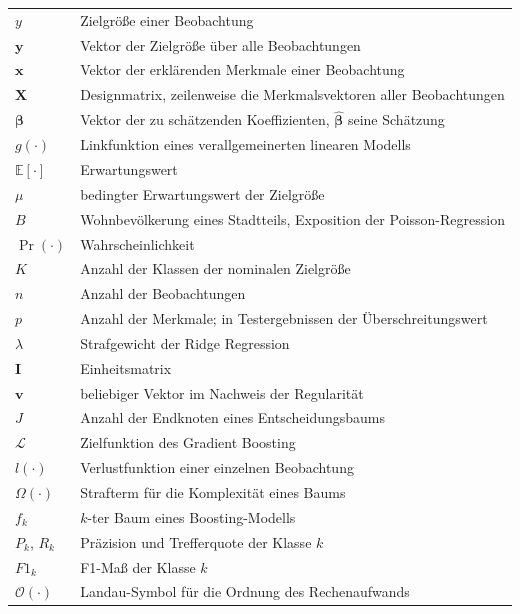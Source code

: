\documentclass[12pt,a4paper]{article}
\begin{document}
\begin{longtable}{@{}ll}
$y$ & Zielgröße einer Beobachtung \\[12pt]
$\mathbf{y}$ & Vektor der Zielgröße über alle Beobachtungen \\[12pt]
$\mathbf{x}$ & Vektor der erklärenden Merkmale einer Beobachtung \\[12pt]
$\mathbf{X}$ & Designmatrix, zeilenweise die Merkmalsvektoren aller Beobachtungen \\[12pt]
$\boldsymbol{\beta}$ & Vektor der zu schätzenden Koeffizienten, $\hat{\boldsymbol{\beta}}$ seine Schätzung \\[12pt]
$g(\cdot)$ & Linkfunktion eines verallgemeinerten linearen Modells \\[12pt]
$\mathbb{E}[\cdot]$ & Erwartungswert \\[12pt]
$\mu$ & bedingter Erwartungswert der Zielgröße \\[12pt]
$B$ & Wohnbevölkerung eines Stadtteils, Exposition der Poisson-Regression \\[12pt]
$\Pr(\cdot)$ & Wahrscheinlichkeit \\[12pt]
$K$ & Anzahl der Klassen der nominalen Zielgröße \\[12pt]
$n$ & Anzahl der Beobachtungen \\[12pt]
$p$ & Anzahl der Merkmale; in Testergebnissen der Überschreitungswert \\[12pt]
$\lambda$ & Strafgewicht der Ridge Regression \\[12pt]
$\mathbf{I}$ & Einheitsmatrix \\[12pt]
$\mathbf{v}$ & beliebiger Vektor im Nachweis der Regularität \\[12pt]
$J$ & Anzahl der Endknoten eines Entscheidungsbaums \\[12pt]
$\mathcal{L}$ & Zielfunktion des Gradient Boosting \\[12pt]
$l(\cdot)$ & Verlustfunktion einer einzelnen Beobachtung \\[12pt]
$\Omega(\cdot)$ & Strafterm für die Komplexität eines Baums \\[12pt]
$f_k$ & $k$-ter Baum eines Boosting-Modells \\[12pt]
$P_k$, $R_k$ & Präzision und Trefferquote der Klasse $k$ \\[12pt]
$F1_k$ & F1-Maß der Klasse $k$ \\[12pt]
$\mathcal{O}(\cdot)$ & Landau-Symbol für die Ordnung des Rechenaufwands \\[12pt]
\end{longtable}
\addtocounter{table}{-1}
\end{document}
